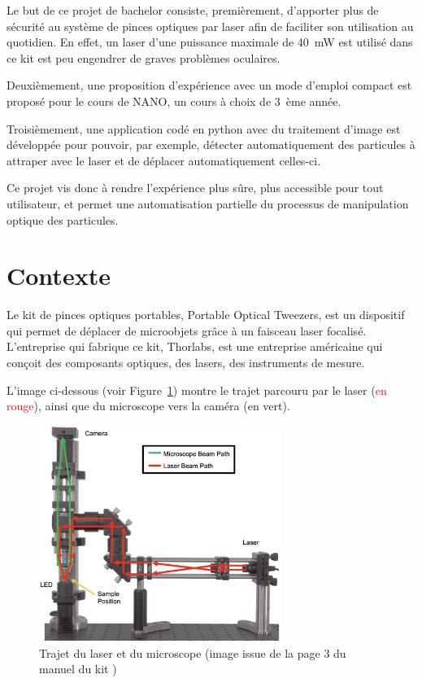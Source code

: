 Le but de ce projet de bachelor consiste, premièrement, d'apporter plus de sécurité au système de pinces optiques par laser afin de faciliter son utilisation au quotidien. En effet, un laser d'une puissance maximale de 40~mW est utilisé dans ce kit est peu engendrer de graves problèmes oculaires.

Deuxièmement, une proposition d'expérience avec un mode d'emploi compact est proposé pour le cours de NANO, un cours à choix de 3~ème année.

Troisièmement, une application codé en python avec du traitement d'image est développée pour pouvoir, par exemple, détecter automatiquement des particules à attraper avec le laser et de déplacer automatiquement celles-ci.

Ce projet vis donc à rendre l'expérience plus sûre, plus accessible pour tout utilisateur, et permet une automatisation partielle du processus de manipulation optique des particules.
\newpage
\section{Contexte}

Le kit de pinces optiques portables, Portable Optical Tweezers, est un dispositif qui permet de déplacer de microobjets grâce à un faisceau laser focalisé. L'entreprise qui fabrique ce kit, Thorlabs, est une entreprise américaine qui conçoit des composants optiques, des lasers, des instruments de mesure.

L'image ci-dessous (voir Figure~\ref{chemin_laser_caméra}) montre le trajet parcouru par le laser (\textcolor{red}{en rouge}), ainsi que du microscope vers la caméra (\textcolor[RGB]{0, 120, 0}{en vert}).
\begin{figure}[H]
    \begin{center}
        \includegraphics[width=0.7\textwidth]{assets/figures/Introduction/chemin_laser_camera.jpeg}
    \end{center}
    \caption{Trajet du laser et du microscope (image issue de la page 3 du manuel du kit \cite{manualPortableOpticalTweezers})}
    \label{chemin_laser_caméra}
\end{figure}

